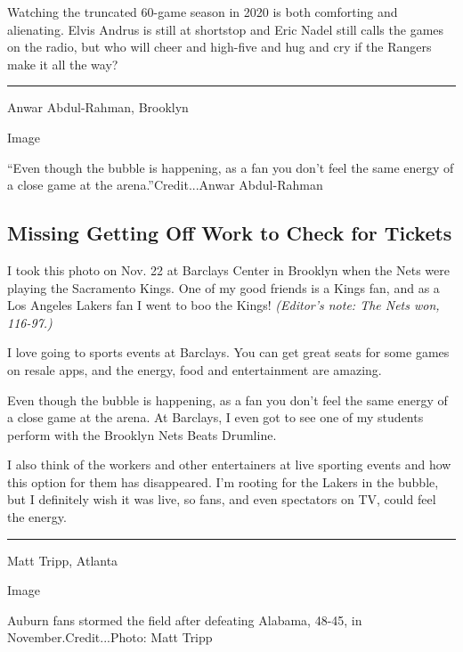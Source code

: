 Watching the truncated 60-game season in 2020 is both comforting and
alienating. Elvis Andrus is still at shortstop and Eric Nadel still
calls the games on the radio, but who will cheer and high-five and hug
and cry if the Rangers make it all the way?

\begin{center}\rule{0.5\linewidth}{\linethickness}\end{center}

Anwar Abdul-Rahman, Brooklyn

Image

``Even though the bubble is happening, as a fan you don't feel the same
energy of a close game at the arena.''Credit...Anwar Abdul-Rahman

\hypertarget{missing-getting-off-work-to-check-for-tickets}{%
\subsection{Missing Getting Off Work to Check for
Tickets}\label{missing-getting-off-work-to-check-for-tickets}}

I took this photo on Nov. 22 at Barclays Center in Brooklyn when the
Nets were playing the Sacramento Kings. One of my good friends is a
Kings fan, and as a Los Angeles Lakers fan I went to boo the Kings!
\emph{(Editor's note: The Nets won, 116-97.)}

I love going to sports events at Barclays. You can get great seats for
some games on resale apps, and the energy, food and entertainment are
amazing.

Even though the bubble is happening, as a fan you don't feel the same
energy of a close game at the arena. At Barclays, I even got to see one
of my students perform with the Brooklyn Nets Beats Drumline.

I also think of the workers and other entertainers at live sporting
events and how this option for them has disappeared. I'm rooting for the
Lakers in the bubble, but I definitely wish it was live, so fans, and
even spectators on TV, could feel the energy.

\begin{center}\rule{0.5\linewidth}{\linethickness}\end{center}

Matt Tripp, Atlanta

Image

Auburn fans stormed the field after defeating Alabama, 48-45, in
November.Credit...Photo: Matt Tripp

